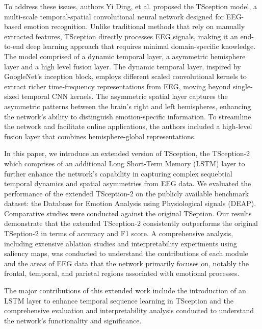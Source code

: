 To address these issues, authors Yi Ding, et al. proposed the TSception model, a multi-scale temporal-spatial convolutional neural network designed for EEG-based emotion recognition. Unlike traditional methods that rely on manually extracted features, TSception directly processes EEG signals, making it an end-to-end deep learning approach that requires minimal domain-specific knowledge. The model comprised of a dynamic temporal layer, a asymmetric hemisphere layer and a high level fusion layer. The dynamic temporal layer, inspired by GoogleNet's inception block, employs different scaled convolutional kernels to extract richer time-frequency representations from EEG, moving beyond single-sized temporal CNN kernels. The asymmetric spatial layer captures the asymmetric patterns between the brain's right and left hemispheres, enhancing the network's ability to distinguish emotion-specific information. To streamline the network and facilitate online applications, the authors included a high-level fusion layer that combines hemisphere-global representations.

In this paper, we introduce an extended version of TSception, the TSception-2 which comprises of an additional Long Short-Term Memory (LSTM) layer to further enhance the network's capability in capturing complex sequebtial temporal dynamics and spatial asymmetries from EEG data. We evaluated the performance of the extended TSception-2 on the publicly available benchmark dataset: the Database for Emotion Analysis using Physiological signals (DEAP). Comparative studies were conducted against the original TSeption. Our results demonstrate that the extended TSception-2 consistently outperforms the original TSeption-2 in terms of accuracy and F1 score. A comprehensive analysis, including extensive ablation studies and interpretability experiments using saliency maps, was conducted to understand the contributions of each module and the areas of EEG data that the network primarily focuses on, notably the frontal, temporal, and parietal regions associated with emotional processes.

The major contributions of this extended work include the introduction of an LSTM layer to enhance temporal sequence learning in TSception and the comprehensive evaluation and interpretability analysis conducted to understand the network's functionality and significance.


